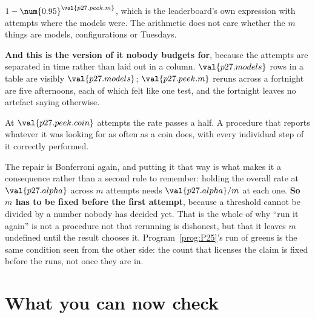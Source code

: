 \begin{fr}

$1 - \num{0.95}^{\val{p27.peek.m}}$, which is the leaderboard's own
expression with attempts where the models were. The arithmetic does not care
whether the $m$ things are models, configurations or Tuesdays.

\textbf{And this is the version of it nobody budgets for}, because the
attempts are separated in time rather than laid out in a column.
$\val{p27.models}$ rows in a table are visibly $\val{p27.models}$;
$\val{p27.peek.m}$ reruns across a fortnight are five afternoons, each of
which felt like one test, and the fortnight leaves no artefact saying
otherwise.

At $\val{p27.peek.coin}$ attempts the rate passes a half. A procedure that
reports whatever it was looking for as often as a coin does, with every
individual step of it correctly performed.

The repair is Bonferroni again, and putting it that way is what makes it a
consequence rather than a second rule to remember: holding the overall rate at
$\val{p27.alpha}$ across $m$ attempts needs
$\val{p27.alpha}/m$ at each one. \textbf{So $m$ has to be fixed before the
first attempt}, because a threshold cannot be divided by a number nobody has
decided yet. That is the whole of why \enquote{run it again} is not a
procedure \dash{} not that rerunning is dishonest, but that it leaves $m$
undefined until the result chooses it. Program~\ref{prog:P25}'s run of greens
is the same condition seen from the other side: the count that licenses the
claim is fixed before the runs, not once they are in.
\end{fr}

\section{What you can now check}
\label{sec:P27-check}

